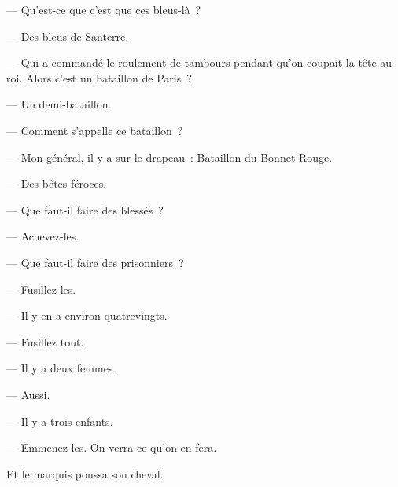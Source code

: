 \documentclass[french,twoside]{book} %
\begin{document}
— Qu’est-ce que c’est que ces bleus-là ?\par
— Des bleus de Santerre.\par
— Qui a commandé le roulement de tambours pendant qu’on coupait la tête au roi. Alors c’est un bataillon de Paris ?\par
— Un demi-bataillon.\par
— Comment s’appelle ce bataillon ?\par
— Mon général, il y a sur le drapeau : Bataillon du Bonnet-Rouge.\par
— Des bêtes féroces.\par
— Que faut-il faire des blessés ?\par
— Achevez-les.\par
— Que faut-il faire des prisonniers ?\par
— Fusillez-les.\par
— Il y en a environ quatrevingts.\par
— Fusillez tout.\par
— Il y a deux femmes.\par
— Aussi.\par
— Il y a trois enfants.\par
— Emmenez-les. On verra ce qu’on en fera.\par
Et le marquis poussa son cheval.
\end{document}
